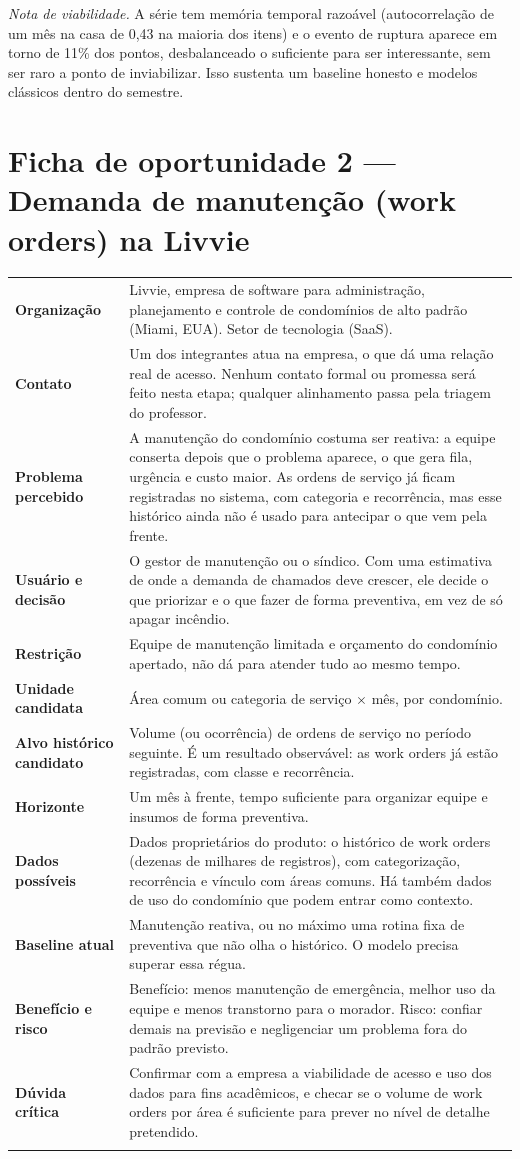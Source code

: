 \documentclass[11pt,a4paper]{article}
\newcommand{\campo}[2]{\textbf{#1} & #2 \\ \addlinespace[1pt]}
\begin{document}
\textit{Nota de viabilidade.} A série tem memória temporal razoável (autocorrelação de um mês na casa de 0{,}43 na maioria dos itens) e o evento de ruptura aparece em torno de 11\% dos pontos, desbalanceado o suficiente para ser interessante, sem ser raro a ponto de inviabilizar. Isso sustenta um baseline honesto e modelos clássicos dentro do semestre.

\section{Ficha de oportunidade 2 --- Demanda de manutenção (work orders) na Livvie}

\begin{tabularx}{\textwidth}{@{}L X@{}}
\toprule
\campo{Organização}{Livvie, empresa de software para administração, planejamento e controle de condomínios de alto padrão (Miami, EUA). Setor de tecnologia (SaaS).}
\campo{Contato}{Um dos integrantes atua na empresa, o que dá uma relação real de acesso. Nenhum contato formal ou promessa será feito nesta etapa; qualquer alinhamento passa pela triagem do professor.}
\campo{Problema percebido}{A manutenção do condomínio costuma ser reativa: a equipe conserta depois que o problema aparece, o que gera fila, urgência e custo maior. As ordens de serviço já ficam registradas no sistema, com categoria e recorrência, mas esse histórico ainda não é usado para antecipar o que vem pela frente.}
\campo{Usuário e decisão}{O gestor de manutenção ou o síndico. Com uma estimativa de onde a demanda de chamados deve crescer, ele decide o que priorizar e o que fazer de forma preventiva, em vez de só apagar incêndio.}
\campo{Restrição}{Equipe de manutenção limitada e orçamento do condomínio apertado, não dá para atender tudo ao mesmo tempo.}
\campo{Unidade candidata}{Área comum ou categoria de serviço $\times$ mês, por condomínio.}
\campo{Alvo histórico candidato}{Volume (ou ocorrência) de ordens de serviço no período seguinte. É um resultado observável: as work orders já estão registradas, com classe e recorrência.}
\campo{Horizonte}{Um mês à frente, tempo suficiente para organizar equipe e insumos de forma preventiva.}
\campo{Dados possíveis}{Dados proprietários do produto: o histórico de work orders (dezenas de milhares de registros), com categorização, recorrência e vínculo com áreas comuns. Há também dados de uso do condomínio que podem entrar como contexto.}
\campo{Baseline atual}{Manutenção reativa, ou no máximo uma rotina fixa de preventiva que não olha o histórico. O modelo precisa superar essa régua.}
\campo{Benefício e risco}{Benefício: menos manutenção de emergência, melhor uso da equipe e menos transtorno para o morador. Risco: confiar demais na previsão e negligenciar um problema fora do padrão previsto.}
\campo{Dúvida crítica}{Confirmar com a empresa a viabilidade de acesso e uso dos dados para fins acadêmicos, e checar se o volume de work orders por área é suficiente para prever no nível de detalhe pretendido.}
\bottomrule
\end{tabularx}
\end{document}
